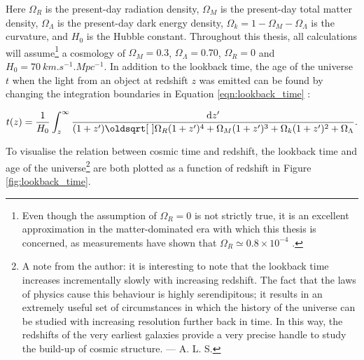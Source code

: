 \noindent Here $\Omega_{R}$ is the present-day radiation density, $\Omega_{M}$ is the present-day total matter density, $\Omega_{\Lambda}$ is the present-day dark energy density, $\Omega_{k}=1-\Omega_{M}-\Omega_{\Lambda}$ is the curvature, and $H_{0}$ is the Hubble constant. Throughout this thesis, all calculations will assume\footnote{Even though the assumption of $\Omega_{R}=0$ is not strictly true, it is an excellent approximation in the matter-dominated era  with which this thesis is concerned, as measurements have shown that $\Omega_{R}\simeq 0.8 \times 10^{-4}$ \citep{2008ARA&A..46..385F}.} a cosmology of $\Omega_{M} = 0.3$, $\Omega_{\Lambda} = 0.70$, $\Omega_{R}=0$ and $H_{0} = \SI{70}{km.s^{-1}.Mpc^{-1}}$. In addition to the lookback time, the age of the universe $t$ when the light from an object at redshift $z$ was emitted can be found by changing the integration boundaries in Equation \ref{eqn:lookback_time} \citep{2008ARA&A..46..385F}: 

\begin{equation}
    t(z)= \frac{1}{H_{0}} \int_{z}^{\infty} \frac{ \diff z'}{(1+z')\sqrt{\Omega_{R}(1+z')^4+\Omega_{M}(1+z')^3+\Omega_{k}(1+z')^2+\Omega_{\Lambda}}}.
\end{equation}

To visualise the relation between cosmic time and redshift, the lookback time and age of the universe\footnote{A note from the author: it is interesting to note that the lookback time increases incrementally slowly with increasing redshift. The fact that the laws of physics cause this behaviour is highly serendipitous; it results in an extremely useful set of circumstances in which the history of the universe can be studied with increasing resolution further back in time. In this way, the redshifts of the very earliest galaxies provide a very precise handle to study the build-up of cosmic structure. --- A. L. S. } are both plotted as a function of redshift in Figure \ref{fig:lookback_time}.  \par




